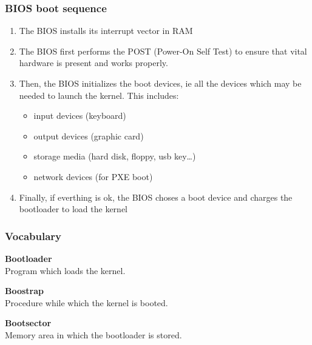 \begin{frame}
  \frametitle{BIOS boot sequence}

  \begin{enumerate}

  \item The BIOS installs its interrupt vector in RAM

  \-

  \item The BIOS first performs the POST (Power-On Self Test) to ensure that vital hardware is present and works properly.

  \-

  \item Then, the BIOS initializes the boot devices, ie all the devices which may be needed to launch the kernel. This includes:

  \-

  \begin{itemize}
  \item input devices (keyboard)
  \item output devices (graphic card)
  \item storage media (hard disk, floppy, usb key\ldots)
  \item network devices (for PXE boot)
  \end{itemize}

  \-

  \item Finally, if everthing is ok, the BIOS choses a boot device and charges the bootloader to load the kernel
  \end{enumerate}

\end{frame}

%
%
%

\begin{frame}
  \frametitle{Vocabulary}

  \begin{description}
  \item {\bf Bootloader}\\
  Program which loads the kernel.

  \nl

  \item {\bf Boostrap}\\
  Procedure while which the kernel is booted.

  \nl

  \item {\bf Bootsector}\\
  Memory area in which the bootloader is stored.
  \end{description}

\end{frame}

